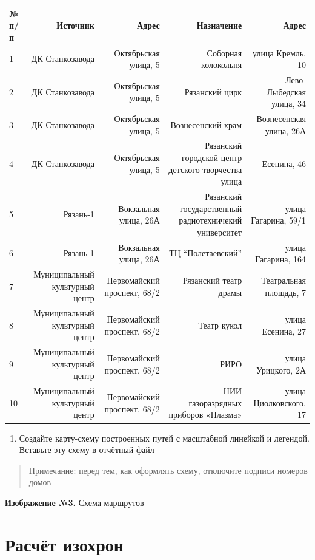 \documentclass[
  12pt,
]{book}
\providecommand{\tightlist}{%
  \setlength{\itemsep}{0pt}\setlength{\parskip}{0pt}}
\begin{document}
\begin{longtable}[]{@{}lrrrr@{}}
\toprule
№ п/п & Источник & Адрес & Назначение & Адрес \\
\midrule
\endhead
1 & ДК Станкозавода & Октябрьская улица, 5 & Соборная колокольня & улица Кремль, 10 \\
2 & ДК Станкозавода & Октябрьская улица, 5 & Рязанский цирк & Лево-Лыбедская улица, 34 \\
3 & ДК Станкозавода & Октябрьская улица, 5 & Вознесенский храм & Вознесенская улица, 26А \\
4 & ДК Станкозавода & Октябрьская улица, 5 & Рязанский городской центр детского творчества улица & Есенина, 46 \\
5 & Рязань-1 & Вокзальная улица, 26А & Рязанский государственный радиотехничекий университет & улица Гагарина, 59/1 \\
6 & Рязань-1 & Вокзальная улица, 26А & ТЦ ``Полетаевский'' & улица Гагарина, 164 \\
7 & Муниципальный культурный центр & Первомайский проспект, 68/2 & Рязанский театр драмы & Театральная площадь, 7 \\
8 & Муниципальный культурный центр & Первомайский проспект, 68/2 & Театр кукол & улица Есенина, 27 \\
9 & Муниципальный культурный центр & Первомайский проспект, 68/2 & РИРО & улица Урицкого, 2А \\
10 & Муниципальный культурный центр & Первомайский проспект, 68/2 & НИИ газоразрядных приборов «Плазма» & улица Циолковского, 17 \\
\bottomrule
\end{longtable}

\begin{enumerate}
\def\labelenumi{\arabic{enumi}.}
\setcounter{enumi}{17}
\tightlist
\item
  Создайте карту-схему построенных путей с масштабной линейкой и легендой. Вставьте эту схему в отчётный файл
\end{enumerate}

\begin{quote}
Примечание: перед тем, как оформлять схему, отключите подписи номеров домов
\end{quote}

\textbf{Изображение №3.} Схема маршрутов

\hypertarget{networks-isochrones}{%
\section{Расчёт изохрон}\label{networks-isochrones}}
\end{document}
